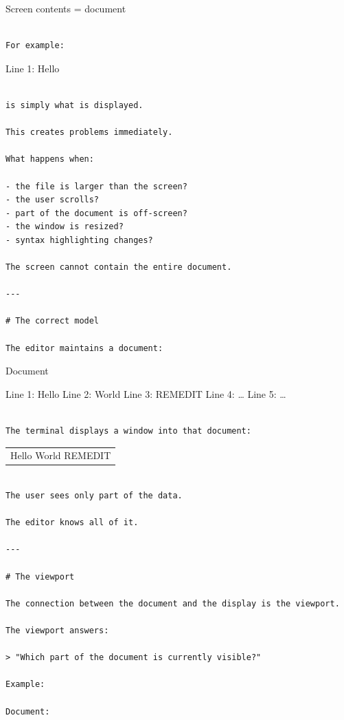 \documentclass[
  oneside,
  openany]{book}
\begin{document}
Screen contents = document

\begin{verbatim}

For example:
\end{verbatim}

Line 1: Hello

\begin{verbatim}

is simply what is displayed.

This creates problems immediately.

What happens when:

- the file is larger than the screen?
- the user scrolls?
- part of the document is off-screen?
- the window is resized?
- syntax highlighting changes?

The screen cannot contain the entire document.

---

# The correct model

The editor maintains a document:
\end{verbatim}

Document

Line 1: Hello Line 2: World Line 3: REMEDIT Line 4: \ldots{} Line 5:
\ldots{}

\begin{verbatim}

The terminal displays a window into that document:
\end{verbatim}

\begin{longtable}[]{@{}
  >{\raggedright\arraybackslash}p{}@{}}
\toprule\noalign{}
\endhead
\bottomrule\noalign{}
\endlastfoot
Hello World REMEDIT \\
\end{longtable}

\begin{verbatim}

The user sees only part of the data.

The editor knows all of it.

---

# The viewport

The connection between the document and the display is the viewport.

The viewport answers:

> "Which part of the document is currently visible?"

Example:

Document:
\end{verbatim}
\end{document}
